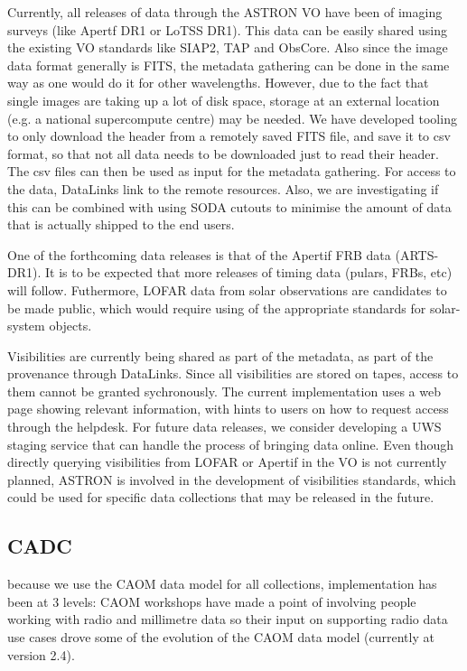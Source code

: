 \documentclass[11pt,a4paper]{ivoatex/ivoa}
\begin{document}
Currently, all releases of data through the ASTRON VO have been of imaging surveys (like Apertf DR1 or LoTSS DR1). This data can be easily shared using the existing VO standards like SIAP2, TAP and ObsCore. Also since the image data format generally is FITS, the metadata gathering can be done in the same way as one would do it for other wavelengths. However, due to the fact that single images are taking up a lot of disk space, storage at an external location (e.g. a national supercompute centre) may be needed. We have developed tooling to only download the header from a remotely saved FITS file, and save it to csv format, so that not all data needs to be downloaded just to read their header. The csv files can then be used as input for the metadata gathering. For access to the data, DataLinks link to the remote resources. Also, we are investigating if this can be combined with using SODA cutouts to minimise the amount of data that is actually shipped to the end users.  

One of the forthcoming data releases is that of the Apertif FRB data (ARTS-DR1). It is to be expected that more releases of timing data (pulars, FRBs, etc) will follow. Futhermore, LOFAR data from solar observations are candidates to be made public, which would require using of the appropriate standards for solar-system objects. 

Visibilities are currently being shared as part of the metadata, as part of the provenance through DataLinks. Since all visibilities are stored on tapes, access to them cannot be granted sychronously. The current implementation uses a web page showing relevant information, with hints to users on how to request access through the helpdesk. For future data releases, we consider developing a UWS staging service that can handle the process of bringing data online. Even though directly querying visibilities from LOFAR or Apertif in the VO is not currently planned, ASTRON is involved in the development of visibilities standards, which could be used for specific data collections that may be released in the future. 

\subsection{CADC}
\label{sec:CADC}
because we use the CAOM data model for all collections, implementation has been at 3 levels:
CAOM workshops have made a point of involving people working with radio and millimetre data so their 
input on supporting radio data use cases drove some of the evolution of the CAOM data model (currently 
at version 2.4).
\end{document}
